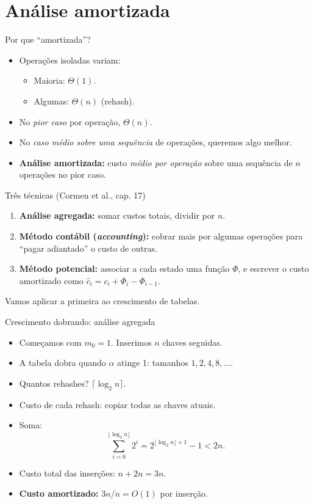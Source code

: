 \documentclass[aspectratio=169]{beamer}
\begin{document}
\section{Análise amortizada}

\begin{frame}{Por que ``amortizada''?}
\begin{itemize}
    \item Operações isoladas variam:
    \begin{itemize}
        \item Maioria: $\Theta(1)$.
        \item Algumas: $\Theta(n)$ (rehash).
    \end{itemize}
    \item No \emph{pior caso} por operação, $\Theta(n)$.
    \item No \emph{caso médio sobre uma sequência} de operações, queremos algo melhor.
    \item \textbf{Análise amortizada:} custo \emph{médio por operação} sobre uma
    sequência de $n$ operações no pior caso.
\end{itemize}
\end{frame}

\begin{frame}{Três técnicas (Cormen et al., cap. 17)}
\begin{enumerate}
    \item \textbf{Análise agregada:} somar custos totais, dividir por $n$.
    \item \textbf{Método contábil (\emph{accounting}):} cobrar mais por algumas
    operações para ``pagar adiantado'' o custo de outras.
    \item \textbf{Método potencial:} associar a cada estado uma função $\Phi$,
    e escrever o custo amortizado como $\hat c_i = c_i + \Phi_i - \Phi_{i-1}$.
\end{enumerate}
\bigskip
Vamos aplicar a primeira ao crescimento de tabelas.
\end{frame}

\begin{frame}{Crescimento dobrando: análise agregada}
\begin{itemize}
    \item Começamos com $m_0 = 1$. Inserimos $n$ chaves seguidas.
    \item A tabela dobra quando $\alpha$ atinge 1: tamanhos $1, 2, 4, 8, \dots$.
    \item Quantos rehashes? $\lceil \log_2 n \rceil$.
    \item Custo de cada rehash: copiar todas as chaves atuais.
    \item Soma:
    \[
    \sum_{i=0}^{\lfloor \log_2 n \rfloor} 2^i = 2^{\lfloor \log_2 n \rfloor + 1} - 1 < 2n.
    \]
    \item Custo total das inserções: $n + 2n = 3n$.
    \item \textbf{Custo amortizado:} $3n/n = O(1)$ por inserção.
\end{itemize}
\end{frame}
\end{document}
